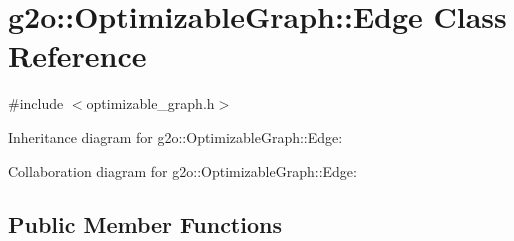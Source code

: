\hypertarget{classg2o_1_1OptimizableGraph_1_1Edge}{}\section{g2o\+:\+:Optimizable\+Graph\+:\+:Edge Class Reference}
\label{classg2o_1_1OptimizableGraph_1_1Edge}


{\ttfamily \#include $<$optimizable\+\_\+graph.\+h$>$}



Inheritance diagram for g2o\+:\+:Optimizable\+Graph\+:\+:Edge\+:


Collaboration diagram for g2o\+:\+:Optimizable\+Graph\+:\+:Edge\+:
\subsection*{Public Member Functions}
